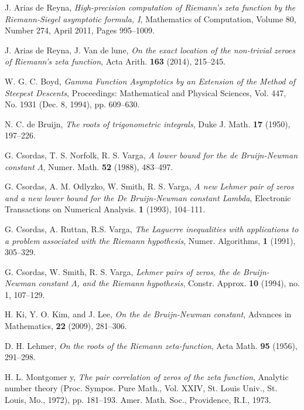 \documentclass[a4paper,11pt,twoside]{amsart}
\begin{document}
\begin{thebibliography}{99} 

J. Arias de Reyna, \emph{High-precision computation of Riemann's zeta function by the Riemann-Siegel asymptotic formula, I}, Mathematics of Computation, Volume 80, Number 274, April 2011, Pages 995--1009.

J. Arias de Reyna, J. Van de lune, \emph{On the exact location of the non-trivial zeroes of Riemann's zeta function}, Acta Arith. \textbf{163} (2014), 215--245.

W. G. C. Boyd, \emph{Gamma Function Asymptotics by an Extension of the Method of Steepest Descents}, Proceedings: Mathematical and Physical Sciences, Vol. 447, No. 1931 (Dec. 8, 1994), pp. 609--630.

N. C. de Bruijn, \emph{The roots of trigonometric integrals}, Duke J. Math. \textbf{17} (1950), 197--226.

%

G. Csordas, T. S. Norfolk, R. S. Varga, \emph{A lower bound for the de Bruijn-Newman constant $\Lambda$}, Numer. Math. \textbf{52} (1988), 483--497.

G. Csordas, A. M. Odlyzko, W. Smith, R. S. Varga, \emph{A new Lehmer pair of zeros and a new lower bound for the De Bruijn-Newman constant Lambda}, Electronic Transactions on Numerical Analysis. \textbf{1} (1993), 104--111.

G. Csordas, A. Ruttan, R.S. Varga, \emph{The Laguerre inequalities with applications
to a problem associated with the Riemann hypothesis}, Numer. Algorithms, \textbf{1} (1991), 305--329.

G. Csordas, W. Smith, R. S. Varga, \emph{Lehmer pairs of zeros, the de Bruijn-Newman constant $\Lambda$, and the Riemann hypothesis},  Constr. Approx. \textbf{10} (1994), no. 1, 107--129. 

H. Ki, Y. O. Kim, and J. Lee, \emph{On the de Bruijn-Newman constant}, Advances in Mathematics, \textbf{22} (2009), 281--306.

D. H. Lehmer, \emph{On the roots of the Riemann zeta-function}, Acta Math. \textbf{95} (1956), 291--298.

H. L. Montgomer
y, \emph{The pair correlation of zeros of the zeta function}, Analytic number theory (Proc. Sympos. Pure Math., Vol. XXIV, St. Louis Univ., St. Louis, Mo., 1972), pp. 181--193. Amer. Math. Soc., Providence, R.I., 1973.


\end{thebibliography}
\end{document}

